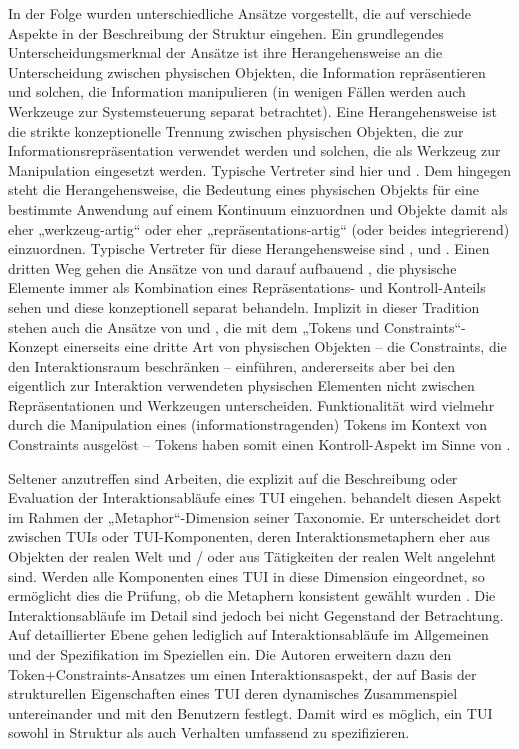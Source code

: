 In der Folge wurden unterschiedliche Ansätze vorgestellt, die auf verschiede Aspekte in der Beschreibung der Struktur eingehen. Ein grundlegendes Unterscheidungsmerkmal der Ansätze ist ihre Herangehensweise an die Unterscheidung zwischen physischen Objekten, die Information repräsentieren und solchen, die Information manipulieren (in wenigen Fällen werden auch Werkzeuge zur Systemsteuerung separat betrachtet). Eine Herangehensweise ist die strikte konzeptionelle Trennung zwischen physischen Objekten, die zur Informationsrepräsentation verwendet werden und solchen, die als Werkzeug zur Manipulation eingesetzt werden. Typische Vertreter sind hier \citep{Ishii97} und \citep{Holmquist99}. Dem hingegen steht die Herangehensweise, die Bedeutung eines physischen Objekts für eine bestimmte Anwendung auf einem Kontinuum einzuordnen und Objekte damit als eher „werkzeug-artig“ oder eher „repräsentations-artig“ (oder beides integrierend) einzuordnen. Typische Vertreter für diese Herangehensweise sind \citep{Underkoffler99}, \citep{Koleva03} und \citep{Fishkin04}. Einen dritten Weg gehen die Ansätze von \citep{Ullmer00} und darauf aufbauend \citep{Ishii08}, die physische Elemente immer als Kombination eines Repräsentations- und Kontroll-Anteils sehen und diese konzeptionell separat behandeln. Implizit in dieser Tradition stehen auch die Ansätze von \citep{Ullmer02} und \citep{Shaer04}, die mit dem „Tokens und Constraints“-Konzept einerseits eine dritte Art von physischen Objekten -- die Constraints, die den Interaktionsraum beschränken -- einführen, andererseits aber bei den eigentlich zur Interaktion verwendeten physischen Elementen nicht zwischen Repräsentationen und Werkzeugen unterscheiden. Funktionalität wird vielmehr durch die Manipulation eines (informationstragenden) Tokens im Kontext von Constraints ausgelöst -- Tokens haben somit einen Kontroll-Aspekt im Sinne von \citep{Ullmer00}.

Seltener anzutreffen sind Arbeiten, die explizit auf die Beschreibung oder Evaluation der Interaktionsabläufe eines \gls{TUI} eingehen. \citet{Fishkin04} behandelt diesen Aspekt im Rahmen der „Metaphor“-Dimension seiner Taxonomie. Er unterscheidet dort zwischen \glspl{TUI} oder \gls{TUI}-Komponenten, deren Interaktionsmetaphern eher aus Objekten der realen Welt und / oder aus Tätigkeiten der realen Welt angelehnt sind. Werden alle Komponenten eines \gls{TUI} in diese Dimension eingeordnet, so ermöglicht dies die Prüfung, ob die Metaphern konsistent gewählt wurden  
\citep{Oppl09d}. Die Interaktionsabläufe im Detail sind jedoch bei \citet{Fishkin04} nicht Gegenstand der Betrachtung. Auf detaillierter Ebene gehen lediglich \citet{Shaer04} auf Interaktionsabläufe im Allgemeinen und der Spezifikation im Speziellen ein. Die Autoren erweitern dazu den Token+Constraints-Ansatzes \citep{Ullmer02} um einen Interaktionsaspekt, der auf Basis der strukturellen Eigenschaften eines \gls{TUI} deren dynamisches Zusammenspiel untereinander und mit den Benutzern festlegt. Damit wird es möglich, ein \gls{TUI} sowohl in Struktur als auch Verhalten umfassend zu spezifizieren.

